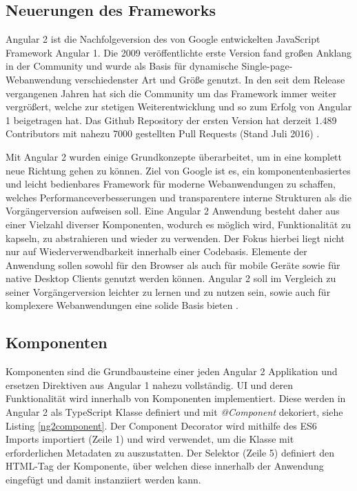 \subsection{Neuerungen des Frameworks}

Angular 2 ist die Nachfolgeversion des von Google entwickelten JavaScript Framework Angular 1.
Die 2009 veröffentlichte erste Version fand großen Anklang in der Community
und wurde als Basis für dynamische Single-page-Webanwendung verschiedenster Art und Größe genutzt.
In den seit dem Release vergangenen Jahren hat sich die Community um das Framework immer weiter vergrößert,
welche zur stetigen Weiterentwicklung und so zum Erfolg von Angular 1 beigetragen hat.
Das Github Repository der ersten Version hat derzeit 1.489 Contributors mit nahezu 7000 gestellten Pull Requests (Stand Juli 2016) \cite{ng1-github}.

Mit Angular 2 wurden einige Grundkonzepte überarbeitet, um in eine komplett neue Richtung gehen zu können.
Ziel von Google ist es, ein komponentenbasiertes und leicht bedienbares Framework für moderne
Webanwendungen zu schaffen, welches Performanceverbesserungen und transparentere interne Strukturen als die Vorgängerversion aufweisen soll.
Eine Angular 2 Anwendung besteht daher aus einer Vielzahl diverser Komponenten, wodurch es möglich wird,
Funktionalität zu kapseln, zu abstrahieren und wieder zu verwenden. Der Fokus hierbei liegt nicht nur auf Wiederverwendbarkeit innerhalb einer Codebasis.
Elemente der Anwendung sollen sowohl für den Browser als auch für mobile Geräte sowie für native Desktop Clients genutzt werden können.
Angular 2 soll im Vergleich zu seiner Vorgängerversion leichter zu lernen und zu nutzen sein,
sowie auch für komplexere Webanwendungen eine solide Basis bieten \cite[11-12]{Angular2}.


\subsection{Komponenten}

Komponenten sind die Grundbausteine einer jeden Angular 2 Applikation und ersetzen Direktiven aus Angular 1 nahezu vollständig.
UI und deren Funktionalität wird innerhalb von Komponenten implementiert.
Diese werden in Angular 2 als TypeScript Klasse definiert und mit \emph{@Component} dekoriert, siehe Listing \ref{ng2component}.
Der Component Decorator wird mithilfe des ES6 Imports importiert (Zeile 1) und wird verwendet, um die Klasse mit erforderlichen Metadaten zu auszustatten.
Der Selektor (Zeile 5) definiert den HTML-Tag der Komponente, über welchen diese innerhalb der Anwendung eingefügt und damit instanziiert werden kann.

